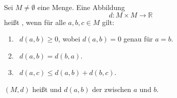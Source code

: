 Sei $M \neq \emptyset$ eine Menge. Eine Abbildung 
$$d: M \times M \to \mathbb{R}$$
heißt , wenn für alle $a, b, c \in M$ gilt:
\begin{enumerate}[label="",leftmargin=0pt]
    \item {} \, $d(a, b) \geq 0$, wobei $d(a, b) = 0$ genau für $a=b$.
    \item {} \, $d(a, b) = d(b, a)$.
    \item {} \, $d(a, c) \leq d(a, b) + d(b, c)$.
\end{enumerate}
$(M, d)$ heißt  und $d(a, b)$ der  zwischen $a$ und $b$.